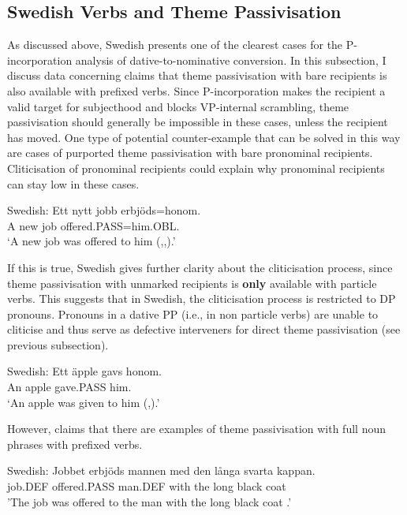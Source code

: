 \subsection{Swedish Verbs and Theme Passivisation}
As discussed above, Swedish presents one of the clearest cases for the P-incorporation analysis of dative-to-nominative conversion. In this subsection, I discuss data concerning claims that theme passivisation with bare recipients is also available with prefixed verbs. Since P-incorporation makes the recipient a valid target for subjecthood and blocks VP-internal scrambling, theme passivisation should generally be impossible in these cases, unless the recipient has moved. One type of potential counter-example that can be solved in this way are cases of purported theme passivisation with bare pronominal recipients. Cliticisation of pronominal recipients could explain why pronominal recipients can stay low in these cases.

\begin{exe}
	\ex Swedish:\label{ex:sw-offer-pass}
	\gll Ett nytt jobb erbjöds=honom.\\
A new job offered.PASS=him.OBL.\\
\trans `A new job was offered to him (\citealt{Anward.1989},\citealt{Falk.1990},\citealt{Lundquist.2006}).'
\end{exe}

If this is true, Swedish gives further clarity about the cliticisation process, since theme passivisation with unmarked recipients is \textbf{only} available with particle verbs. This suggests that in Swedish, the cliticisation process is restricted to DP pronouns. Pronouns in a dative PP (i.e., in non particle verbs) are unable to cliticise and thus serve as defective interveners for direct theme passivisation (see previous subsection).

\begin{exe}
	\ex Swedish:\label{ex:sw-give-pass}
	\gll *Ett äpple gavs honom.\\
	 An apple gave.PASS him.\\
	 \trans `An apple was given to him (\citealt{Anward.1989},\citealt{Lundquist.2006}).'
\end{exe}

However, \cite{Lundquist.2004} claims that there are examples of theme passivisation with full noun phrases with prefixed verbs.

\begin{exe}
	\ex Swedish:\label{ex:sw-offer-thepas}
	\gll Jobbet erbjöds mannen med den långa svarta kappan.\\
	job.DEF offered.PASS man.DEF with the long black coat\\
	'The job was offered to the man with the long black coat \citep[ex 26]{Lundquist.2004}.'
\end{exe}

